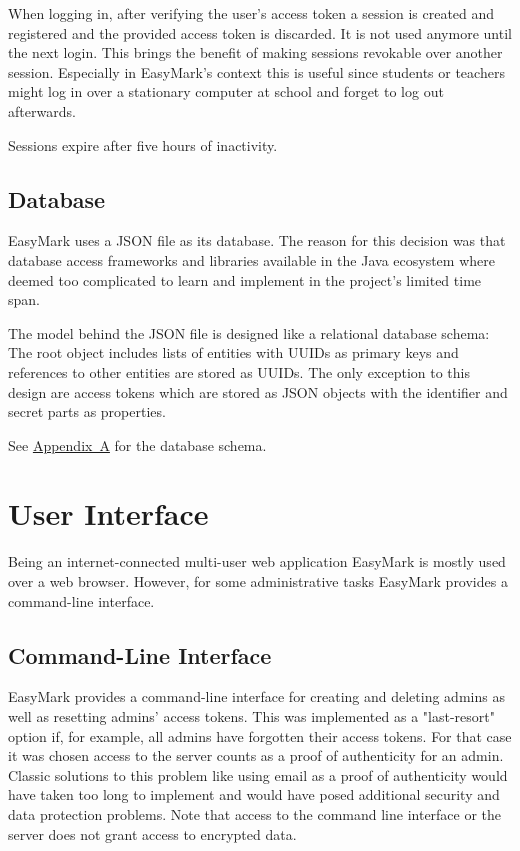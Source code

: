 \documentclass[12pt,a4paper,oneside]{report}
\newcommand{\RefAppendix}[1]{\hyperref[app:#1]{Appendix~#1}}
\begin{document}
	When logging in, after verifying the user's access token a session is created and registered and the provided access token is discarded. It is not used anymore until the next login. This brings the benefit of making sessions revokable over another session. Especially in EasyMark's context this is useful since students or teachers might log in over a stationary computer at school and forget to log out afterwards.

	Sessions expire after five hours of inactivity.

	\subsection{Database}
	EasyMark uses a JSON file as its database. The reason for this decision was that database access frameworks and libraries available in the Java ecosystem where deemed too complicated to learn and implement in the project's limited time span.

	The model behind the JSON file is designed like a relational database schema: The root object includes lists of entities with UUIDs as primary keys and references to other entities are stored as UUIDs. The only exception to this design are access tokens which are stored as JSON objects with the identifier and secret parts as properties.

	See \RefAppendix{A} for the database schema.

	\section{User Interface}
	Being an internet-connected multi-user web application EasyMark is mostly used over a web browser. However, for some administrative tasks EasyMark provides a command-line interface.

	\subsection{Command-Line Interface}
	EasyMark provides a command-line interface for creating and deleting admins as well as resetting admins' access tokens. This was implemented as a "last-resort" option if, for example, all admins have forgotten their access tokens. For that case it was chosen access to the server counts as a proof of authenticity for an admin. Classic solutions to this problem like using email as a proof of authenticity would have taken too long to implement and would have posed additional security and data protection problems. Note that access to the command line interface or the server does not grant access to encrypted data.
\end{document}
